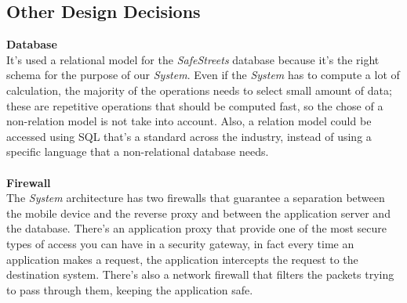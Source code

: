 \documentclass{article}
\begin{document}
	\subsection{Other Design Decisions}
	{\bf Database} \\
	It's used a relational model for the {\it SafeStreets} database because it's the right schema for the purpose of our {\it System}. Even if the {\it System} has to compute a lot of calculation, the majority of the operations needs to select small amount of data; these are repetitive operations that should be computed fast, so the chose of a non-relation model is not take into account. Also, a relation model could be accessed using SQL that's a standard across the industry, instead of using a specific language that a non-relational database needs.
	\\ \\ 
	{\bf Firewall} \\ 
	The {\it System} architecture has two firewalls that guarantee a separation between the mobile device and the reverse proxy and between the application server and the database. There's an application proxy that provide one of the most secure types of access you can have in a security gateway, in fact every time an application makes a request, the application intercepts the request to the destination system. There's also a network firewall that filters the packets trying to pass through them, keeping the application safe.
	\\ \\
	
\pagebreak

\end{document}
